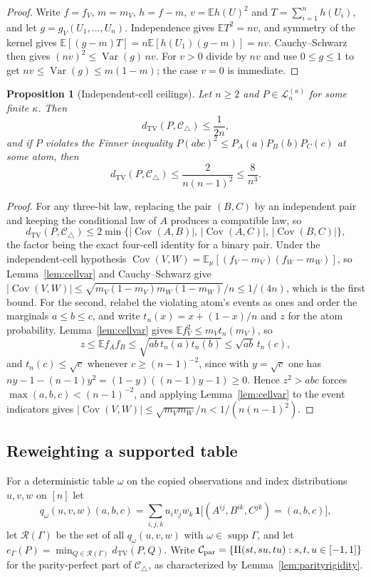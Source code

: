 \documentclass[11pt]{article}
\theoremstyle{plain}
\newtheorem{proposition}[theorem]{Proposition}
\theoremstyle{definition}
\DeclareMathOperator{\TV}{TV}
\newcommand{\Ctri}{\mathcal C_{\triangle}}
\newcommand{\E}{\mathbb E}
\newcommand{\one}{\mathbf 1}
\begin{document}
\begin{proof}
Write $f=f_V$, $m=m_V$, $h=f-m$, $v=\E h(U)^2$ and $T=\sum_{i=1}^nh(U_i)$, and let $g=g_V(U_1,\dots,U_n)$. Independence gives $\E T^2=nv$, and symmetry of the kernel gives $\E[(g-m)T]=n\E[h(U_1)(g-m)]=nv$. Cauchy--Schwarz then gives $(nv)^2\le\operatorname{Var}(g)\,nv$. For $v>0$ divide by $nv$ and use $0\le g\le1$ to get $nv\le\operatorname{Var}(g)\le m(1-m)$; the case $v=0$ is immediate.
\end{proof}

\begin{proposition}[Independent-cell ceilings]\label{prop:cellceiling}
Let $n\ge2$ and $P\in\mathcal L_n^{(\kappa)}$ for some finite $\kappa$. Then
\[
d_{\TV}(P,\Ctri)\le\frac1{2n},
\]
and if $P$ violates the Finner inequality $P(abc)^2\le P_A(a)P_B(b)P_C(c)$ at some atom, then
\[
d_{\TV}(P,\Ctri)\le\frac2{n(n-1)^2}\le\frac8{n^3}.
\]
\end{proposition}

\begin{proof}
For any three-bit law, replacing the pair $(B,C)$ by an independent pair and keeping the conditional law of $A$ produces a compatible law, so
\[
d_{\TV}(P,\Ctri)\le2\min\bigl\{|\operatorname{Cov}(A,B)|,\,|\operatorname{Cov}(A,C)|,\,|\operatorname{Cov}(B,C)|\bigr\},
\]
the factor being the exact four-cell identity for a binary pair. Under the independent-cell hypothesis $\operatorname{Cov}(V,W)=\E_\mu[(f_V-m_V)(f_W-m_W)]$, so Lemma~\ref{lem:cellvar} and Cauchy--Schwarz give $|\operatorname{Cov}(V,W)|\le\sqrt{m_V(1-m_V)m_W(1-m_W)}/n\le1/(4n)$, which is the first bound. For the second, relabel the violating atom's events as ones and order the marginals $a\le b\le c$, and write $t_n(x)=x+(1-x)/n$ and $z$ for the atom probability. Lemma~\ref{lem:cellvar} gives $\E f_V^2\le m_Vt_n(m_V)$, so
\[
z\le\E f_Af_B\le\sqrt{ab\,t_n(a)t_n(b)}\le\sqrt{ab}\,t_n(c),
\]
and $t_n(c)\le\sqrt c$ whenever $c\ge(n-1)^{-2}$, since with $y=\sqrt c$ one has $ny-1-(n-1)y^2=(1-y)((n-1)y-1)\ge0$. Hence $z^2>abc$ forces $\max(a,b,c)<(n-1)^{-2}$, and applying Lemma~\ref{lem:cellvar} to the event indicators gives $|\operatorname{Cov}(V,W)|\le\sqrt{m_Vm_W}/n<1/(n(n-1)^2)$.
\end{proof}


\subsection{Reweighting a supported table}

For a deterministic table $\omega$ on the copied observations and index distributions $u,v,w$ on $[n]$ let
\[
q_\omega(u,v,w)(a,b,c)=\sum_{i,j,k}u_iv_jw_k\,\one\bigl[(A^{ij},B^{ik},C^{jk})=(a,b,c)\bigr],
\]
let $\mathcal R(\Gamma)$ be the set of all $q_\omega(u,v,w)$ with $\omega\in\operatorname{supp}\Gamma$, and let $e_\Gamma(P)=\min_{Q\in\mathcal R(\Gamma)}d_{\TV}(P,Q)$. Write $\mathcal C_{\mathrm{par}}=\{\Pi(st,su,tu):s,t,u\in[-1,1]\}$ for the parity-perfect part of $\Ctri$, as characterized by Lemma~\ref{lem:parityrigidity}.
\end{document}
